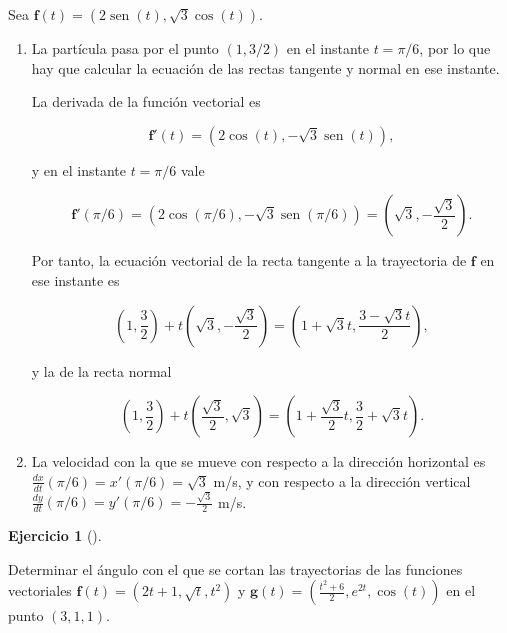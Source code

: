 \documentclass[
  a4paper,
]{scrreport}
\theoremstyle{definition}
\newtheorem{exercise}{Ejercicio}[chapter]
\theoremstyle{remark}
\begin{document}
\begin{tcolorbox}[enhanced jigsaw, coltitle=black, toptitle=1mm, colframe=quarto-callout-tip-color-frame, colbacktitle=quarto-callout-tip-color!10!white, breakable, opacityback=0, bottomtitle=1mm, opacitybacktitle=0.6, title=\textcolor{quarto-callout-tip-color}{\faLightbulb}\hspace{0.5em}{Solución}, arc=.35mm, leftrule=.75mm, toprule=.15mm, titlerule=0mm, bottomrule=.15mm, left=2mm, rightrule=.15mm, colback=white]

Sea \(\mathbf{f}(t)=(2\operatorname{sen}(t), \sqrt{3}\cos(t))\).

\begin{enumerate}
\def\labelenumi{\alph{enumi}.}
\item
  La partícula pasa por el punto \((1,3/2)\) en el instante \(t=\pi/6\),
  por lo que hay que calcular la ecuación de las rectas tangente y
  normal en ese instante.

  La derivada de la función vectorial es

  \[
  \mathbf{f}'(t) = (2\cos(t), -\sqrt{3}\operatorname{sen}(t)),
  \]

  y en el instante \(t=\pi/6\) vale

  \[
  \mathbf{f}'(\pi/6) = (2\cos(\pi/6), -\sqrt{3}\operatorname{sen}(\pi/6)) = \left(\sqrt{3},-\frac{\sqrt{3}}{2}\right).
  \]

  Por tanto, la ecuación vectorial de la recta tangente a la trayectoria
  de \(\mathbf{f}\) en ese instante es

  \[
  \left(1,\frac{3}{2}\right)+ t\left(\sqrt{3},-\frac{\sqrt{3}}{2}\right) 
  = \left(1+\sqrt{3}t,\frac{3-\sqrt{3}t}{2}\right),
  \]

  y la de la recta normal

  \[
  \left(1,\frac{3}{2}\right)+ t\left(\frac{\sqrt{3}}{2},\sqrt{3}\right) 
  = \left(1+\frac{\sqrt{3}}{2}t,\frac{3}{2}+\sqrt{3}t\right).
  \]
\item
  La velocidad con la que se mueve con respecto a la dirección
  horizontal es \(\frac{dx}{dt} (\pi/6) = x'(\pi/6) = \sqrt{3}\) m/s, y
  con respecto a la dirección vertical
  \(\frac{dy}{dt} (\pi/6) = y'(\pi/6) = -\frac{\sqrt{3}}{2}\) m/s.
\end{enumerate}

\end{tcolorbox}

\begin{exercise}[]\protect\hypertarget{exr-angulo-entre-trayectorias}{}\label{exr-angulo-entre-trayectorias}

Determinar el ángulo con el que se cortan las trayectorias de las
funciones vectoriales \(\mathbf{f}(t) = (2t+1, \sqrt{t}, t^2)\) y
\(\mathbf{g}(t)=\left(\frac{t^2+6}{2}, e^{2t}, \cos(t)\right)\) en el
punto \((3,1,1)\).

\end{exercise}
\end{document}
